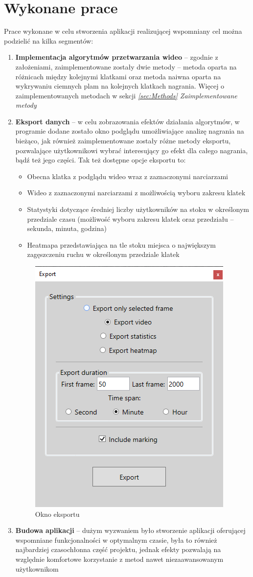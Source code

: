 \documentclass[a4paper]{article}
\begin{document}
\section{Wykonane prace}
Prace wykonane w celu stworzenia aplikacji realizującej wspomniany cel można podzielić na kilka segmentów:
\begin{enumerate}
\item \textbf{Implementacja algorytmów przetwarzania wideo} – zgodnie z założeniami, zaimplementowane zostały dwie metody – metoda oparta na różnicach między kolejnymi klatkami oraz metoda naiwna oparta na wykrywaniu ciemnych plam na kolejnych klatkach nagrania. Więcej o zaimplementowanych metodach w sekcji \textit{\ref{sec:Methods} Zaimplementowane metody}
\item \textbf{Eksport danych} – w celu zobrazowania efektów działania algorytmów, w programie dodane zostało okno podglądu umożliwiające analizę nagrania na bieżąco, jak również zaimplementowane zostały różne metody eksportu, pozwalające użytkownikowi wybrać interesujący go efekt dla całego nagrania, bądź też jego części. Tak też dostępne opcje eksportu to:
\begin{itemize}
\item Obecna klatka z podglądu wideo wraz z zaznaczonymi narciarzami
\item Wideo z zaznaczonymi narciarzami  z możliwością wyboru zakresu klatek
\item Statystyki dotyczące średniej liczby użytkowników na stoku w określonym przedziale czasu (możliwość wyboru zakresu klatek oraz przedziału – sekunda, minuta, godzina)
\item Heatmapa przedstawiająca na tle stoku miejsca o największym zagęszczeniu ruchu w określonym przedziale klatek
\end{itemize}
\begin{figure}[H]
  \centering
  \includegraphics[width=0.4\linewidth]{resources/img4.png}
  \caption{Okno eksportu}
\end{figure}
\item \textbf{Budowa aplikacji} – dużym wyzwaniem było stworzenie aplikacji oferującej wspomniane funkcjonalności w optymalnym czasie, była to również najbardziej czasochłonna część projektu, jednak efekty pozwalają na względnie komfortowe korzystanie z metod nawet niezaawansowanym użytkownikom
\end{enumerate}
\end{document}
